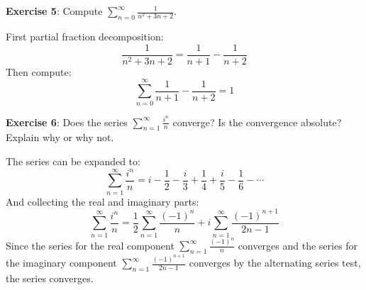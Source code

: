 \documentclass{article}
\begin{document}
\newpage

\textbf{Exercise 5}: Compute $\sum_{n = 0}^{\infty}\frac{1}{n^{2} + 3n + 2}$.
    \begin{answer}
        First partial fraction decomposition:
            \begin{equation*}
                \dfrac{1}{n^{2} + 3n + 2} = \dfrac{1}{n + 1} - \dfrac{1}{n + 2}
            \end{equation*}
        Then compute:
            \begin{equation*}
                \sum_{n = 0}^{\infty}\dfrac{1}{n + 1} - \dfrac{1}{n + 2} = 1
            \end{equation*}
    \end{answer}

\newpage

\textbf{Exercise 6}: Does the series $\sum_{n = 1}^{\infty}\frac{i^{n}}{n}$ converge? Is the convergence absolute? Explain why or why not.
    \begin{answer}
        The series can be expanded to:
            \begin{equation*}
                \sum_{n = 1}^{\infty}\dfrac{i^{n}}{n} = i - \dfrac{1}{2} - \dfrac{i}{3} + \dfrac{1}{4} + \dfrac{i}{5} - \dfrac{1}{6} - \cdots
            \end{equation*}
        And collecting the real and imaginary parts:
            \begin{equation*}
                \sum_{n = 1}^{\infty} \dfrac{i^{n}}{n} = \dfrac{1}{2} \sum_{n = 1}^{\infty}\dfrac{(-1)^{n}}{n} + i\sum_{n = 1}^{\infty} \dfrac{(-1)^{n + 1}}{2n - 1}
            \end{equation*}
        Since the series for the real component $\sum_{n = 1}^{\infty} \frac{(-1)^{n}}{n}$ converges and the series for the imaginary component $\sum_{n = 1}^{\infty}\frac{(-1)^{n + 1}}{2n - 1}$ converges by the alternating series test, the series converges.
    \end{answer}

\newpage
\end{document}
